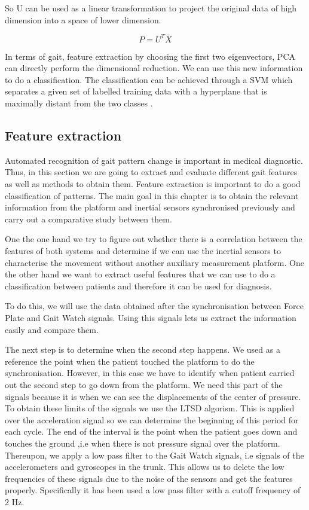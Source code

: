 So U can be used as a linear transformation to project the original data of high dimension into a space of lower dimension.

$$P=U^T\bar{X}$$

In terms of gait, feature extraction by choosing the first two eigenvectors, PCA can directly perform the dimensional reduction\cite{Jeon}.
We can use this new information to do a classification. The classification can be achieved through a SVM which separates a given set of labelled training data with a hyperplane that is maximally distant from the two classes \cite{Gorriz}.

\subsection{Feature extraction}
Automated recognition of gait pattern change is important in medical diagnostic. Thus, in this section we are going to extract and evaluate different gait features as well as methods to obtain them. Feature extraction is important	to do a good classification of patterns.
The main goal in this chapter is to obtain the relevant information from the platform and inertial sensors synchronised previously and carry out a comparative study between them.

One the one hand we try to figure out whether there is a correlation between the features of both systems and determine if we can use the inertial sensors to characterise the movement without another auxiliary measurement platform.
One the other hand we want to extract useful features that we can use to do a classification between patients and therefore it can be used for diagnosis.

To do this, we will use the data obtained after the synchronisation between Force Plate and Gait Watch signals. Using this signals lets us extract the information easily and compare them.

The next step is to determine when the second step happens. We used as a reference the point when the patient touched the platform to do the synchronisation. However, in this case we have to identify when patient carried out the second step to go down from the platform. We need this part of the signals because it is when we can see the displacements of the center of pressure. To obtain these limits of the signals we use the LTSD algorism. This is applied over the acceleration signal so we can determine the beginning of this period for each cycle. The end of the interval is the point when the patient goes down and touches the ground ,i.e when there is not pressure signal over the platform.
Thereupon, we apply a low pass filter to the  Gait Watch signals, i.e signals of the accelerometers and gyroscopes in the trunk. This allows us to delete the low frequencies  of these signals due to the noise of the sensors and get the features properly. Specifically it has been used a low pass filter with a cutoff frequency of 2 Hz.

